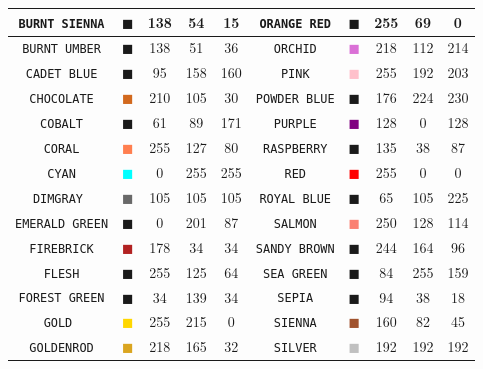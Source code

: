 \documentclass[11pt]{book}
\newcommand{\ct}{\tt\small}
\begin{document}
\begin{table}[p]
\begin{center}
\begin{tabular}{|c|c|c|c|c|c||c|c|c|c|}
{\ct BURNT SIENNA} & \textcolor{BURNT SIENNA} {$\blacksquare$} & 138& 54& 15& {\ct ORANGE RED} &  \textcolor{ORANGE RED} {$\blacksquare$} & 255& 69& 0  \\ \hline
{\ct BURNT UMBER} & \textcolor{BURNT UMBER} {$\blacksquare$} & 138& 51& 36& {\ct ORCHID} &  \textcolor{ORCHID} {$\blacksquare$} & 218& 112& 214  \\ \hline
{\ct CADET BLUE} & \textcolor{CADET BLUE} {$\blacksquare$} & 95& 158& 160& {\ct PINK} &  \textcolor{PINK} {$\blacksquare$} & 255& 192& 203  \\ \hline
{\ct CHOCOLATE} & \textcolor{CHOCOLATE} {$\blacksquare$} & 210& 105& 30& {\ct POWDER BLUE} &  \textcolor{POWDER BLUE} {$\blacksquare$} & 176& 224& 230  \\ \hline
{\ct COBALT} & \textcolor{COBALT} {$\blacksquare$} & 61& 89& 171& {\ct PURPLE} &  \textcolor{PURPLE} {$\blacksquare$} & 128& 0& 128  \\ \hline
{\ct CORAL} & \textcolor{CORAL} {$\blacksquare$} & 255& 127& 80& {\ct RASPBERRY} &  \textcolor{RASPBERRY} {$\blacksquare$} & 135& 38& 87  \\ \hline
{\ct CYAN} & \textcolor{CYAN} {$\blacksquare$} & 0& 255& 255& {\ct RED} &  \textcolor{RED} {$\blacksquare$} & 255& 0& 0  \\ \hline
{\ct DIMGRAY } & \textcolor{DIMGRAY } {$\blacksquare$} & 105& 105& 105& {\ct ROYAL BLUE} &  \textcolor{ROYAL BLUE} {$\blacksquare$} & 65& 105& 225  \\ \hline
{\ct EMERALD GREEN} & \textcolor{EMERALD GREEN} {$\blacksquare$} & 0& 201& 87& {\ct SALMON} &  \textcolor{SALMON} {$\blacksquare$} & 250& 128& 114  \\ \hline
{\ct FIREBRICK} & \textcolor{FIREBRICK} {$\blacksquare$} & 178& 34& 34& {\ct SANDY BROWN} &  \textcolor{SANDY BROWN} {$\blacksquare$} & 244& 164& 96  \\ \hline
{\ct FLESH} & \textcolor{FLESH} {$\blacksquare$} & 255& 125& 64& {\ct SEA GREEN} &  \textcolor{SEA GREEN} {$\blacksquare$} & 84& 255& 159  \\ \hline
{\ct FOREST GREEN} & \textcolor{FOREST GREEN} {$\blacksquare$} & 34& 139& 34& {\ct SEPIA} &  \textcolor{SEPIA} {$\blacksquare$} & 94& 38& 18  \\ \hline
{\ct GOLD } & \textcolor{GOLD } {$\blacksquare$} & 255& 215& 0& {\ct SIENNA} &  \textcolor{SIENNA} {$\blacksquare$} & 160& 82& 45  \\ \hline
{\ct GOLDENROD} & \textcolor{GOLDENROD} {$\blacksquare$} & 218& 165& 32& {\ct SILVER} &  \textcolor{SILVER} {$\blacksquare$} & 192& 192& 192  \\ \hline

\end{tabular}
\end{center}
\end{table}
\end{document}
